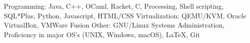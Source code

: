 \begin{cvskills}
    \cvskill
    {Programming:}
    {Java, C++, OCaml, Racket, C, Processing, Shell scripting, SQL*Plus, Python, Javascript, HTML/CSS}
    \cvskill
    {Virtualization:}
    {QEMU/KVM, Oracle VirtualBox, VMWare Fusion}
	\cvskill
	{Other:}
	{GNU/Linux Systems Administration, Proficiency in major OS's (UNIX, Windows, macOS), LaTeX, Git}
	\vspace{-1.5em} %
\end{cvskills}
